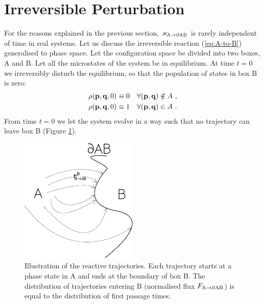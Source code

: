 \section{Irreversible Perturbation}

For the reasons explained in the previous section, ${\varkappa}_{\rm A \rightarrow \partial AB }$ is rarely independent of time in real systems.
Let us discuss the irreversible reaction (\ref{eq:A-to-B}) generalised to phase space.
Let the configuration space be divided into two boxes, A and B.
Let all the microstates of the system be in equilibrium.
At time $t=0$ we irreversibly disturb the equilibrium, so that the population of states in box B is zero:
\begin{equation}
\label{eq:start-irrev}
\begin{split}
\rho ({\bf p},{\bf q} , 0 ) \equiv 0 ~~~ \forall ({\bf p},{\bf q} ) \notin A ~ ,
\\
\rho ({\bf p},{\bf q} , 0 ) \equiv 1 ~~~ \forall ({\bf p},{\bf q} ) \in A ~ .
\end{split}
\end{equation}
From time $t=0$ we let the system evolve in a way such that no trajectory can leave box B (Figure \ref{fig:irrev-trajs}).

\begin{figure}[h]
\centering
\includegraphics[height=6cm]{Images/diagAtoB.pdf}
\caption[Trajectories ending at the dividing surface.]{Illustration of the reactive trajectories. Each trajectory starts at a phase state in A and ends at the boundary of box B. The distribution of trajectories entering B (normalised flux $F_{\rm A\rightarrow \partial AB}$) is equal to the distribution of first passage times.}
\label{fig:irrev-trajs}
\end{figure}

